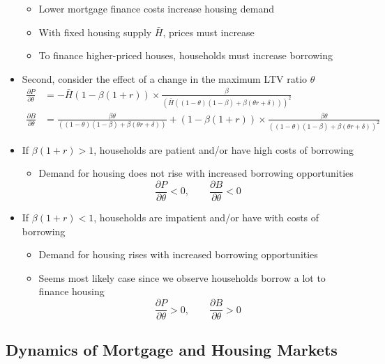 \documentclass[a4paper,twoside]{article}
\numberwithin{equation}{section}
\numberwithin{figure}{section}
\begin{document}
\begin{itemize}
		\begin{itemize}
			\item Lower mortgage finance costs increase housing demand
			\item With fixed housing supply \( \bar{H} \), prices must increase
			\item To finance higher-priced houses, households must increase borrowing
		\end{itemize}
		\item Second, consider the effect of a \textcolor{myblue}{change in the maximum LTV ratio \( \theta \)}
		\begin{align*}
			\frac{\partial P}{\partial\theta} &= -\bar{H}(1-\beta(1+r)) \times \frac{\beta}{(\bar{H}((1-\theta)(1-\beta)+\beta(\theta r+\delta)))^2} \\
			\frac{\partial B}{\partial\theta} &= \frac{\beta\theta}{((1-\theta)(1-\beta)+\beta(\theta r+\delta))} + (1-\beta(1+r)) \times \frac{\beta\theta}{((1-\theta)(1-\beta)+\beta(\theta r+\delta))^2}
		\end{align*}
		\item If \( \beta(1+r) > 1 \), households are patient and/or have high costs of borrowing
		\begin{itemize}
			\item Demand for housing does not rise with increased borrowing opportunities
			\[
				\frac{\partial P}{\partial \theta} <0, \qquad \frac{\partial B}{\partial \theta} <0 
			\]
		\end{itemize}
		\item If \( \beta(1+r) < 1 \), households are impatient and/or have with costs of borrowing
		\begin{itemize}
			\item Demand for housing rises with increased borrowing opportunities
			\item Seems most likely case since we observe households borrow a lot to finance housing
			\[
				\frac{\partial P}{\partial \theta} >0, \qquad \frac{\partial B}{\partial \theta} >0 
			\]
		\end{itemize}
	\end{itemize}
\subsection{Dynamics of Mortgage and Housing Markets}
\end{document}
